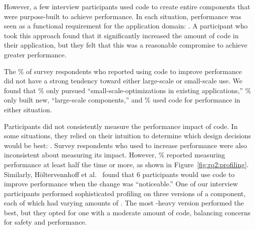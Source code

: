 However, a few interview participants used \unsafe code to create entire components that were purpose-built to achieve performance.  In each situation, performance was seen as a functional requirement for the application domain: . A participant who took this approach found that it significantly increased the amount of \unsafe code in their application, but they felt that this was a reasonable compromise to achieve greater performance.

The \% of survey respondents who reported using \unsafe code to improve performance did not have a strong tendency toward either large-scale or small-scale use. We found that \% only pursued ``small-scale-optimizations in existing applications,'' \% only built new, ``large-scale components,'' and \% used \unsafe code for performance in either situation.


Participants did not consistently measure the performance impact of \unsafe code. In some situations, they relied on their intuition to determine which design decisions would be best: . Survey respondents who used \unsafe to increase performance were also inconsistent about measuring its impact. However, \profilingmore\% reported measuring performance at least half the time or more, as shown in Figure~\ref{fig:rq2:profiling}. Similarly, Höltervennhoff et al.~\cite{holtervennhoff23} found that 6 participants would use \unsafe code to improve performance when the change was ``noticeable.'' One of our interview participants performed sophisticated profiling on three versions of a component, each of which had varying amounts of \unsafe. The most \unsafe-heavy version performed the best, but they opted for one with a moderate amount of \unsafe code, balancing concerns for safety and performance. 

